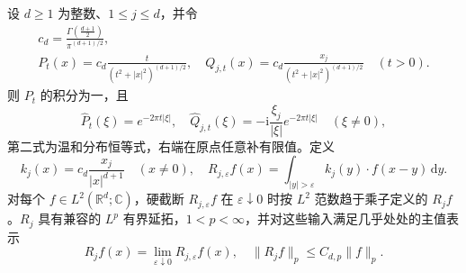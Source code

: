 \begin{proposition}\label{b2:prop:18-riesz-realization}
设 \(d\geq1\) 为整数、\(1\leq j\leq d\)，并令
\[
 \begin{gathered}
 c_d=\frac{\Gamma\left(\frac{d+1}{2}\right)}{\pi^{(d+1)/2}},\\
 P_t(x)=c_d\frac{t}{(t^2+|x|^2)^{(d+1)/2}},
 \quad Q_{j,t}(x)=c_d\frac{x_j}{(t^2+|x|^2)^{(d+1)/2}}
 \quad(t>0).
 \end{gathered}
\]
则 \(P_t\) 的积分为一，且
\[
 \widehat P_t(\xi)=e^{-2\pi t|\xi|},
 \quad
 \widehat Q_{j,t}(\xi)=-\mathrm i\frac{\xi_j}{|\xi|}e^{-2\pi t|\xi|}
 \quad(\xi\ne0),
\]
第二式为温和分布恒等式，右端在原点任意补有限值。定义
\[
 k_j(x)=c_d\frac{x_j}{|x|^{d+1}}\quad(x\ne0),
 \quad
 R_{j,\varepsilon}f(x)=\int_{|y|>\varepsilon}k_j(y)\cdot f(x-y)\,\mathrm dy.
\]
对每个 \(f\in L^2(\mathbb R^d;\mathbb C)\)，硬截断 \(R_{j,\varepsilon}f\) 在 \(\varepsilon\downarrow0\) 时按 \(L^2\) 范数趋于乘子定义的 \(R_jf\)。\(R_j\) 具有兼容的 \(L^p\) 有界延拓，\(1<p<\infty\)，并对这些输入满足几乎处处的主值表示
\[
 R_jf(x)=\lim_{\varepsilon\downarrow0}R_{j,\varepsilon}f(x),
 \quad \|R_jf\|_p\leq C_{d,p}\|f\|_p.
\]
\end{proposition}

